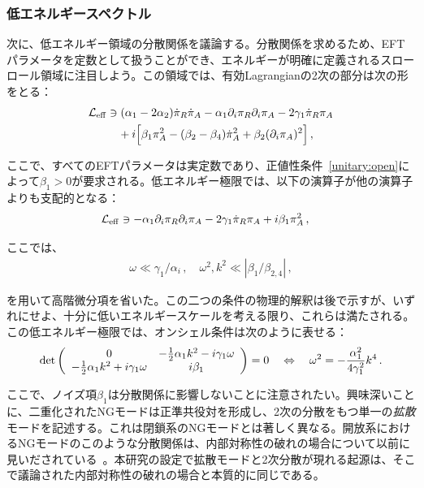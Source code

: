 \subsubsection{低エネルギースペクトル}

次に、低エネルギー領域の分散関係を議論する。分散関係を求めるため、EFTパラメータを定数として扱うことができ、エネルギーが明確に定義されるスローロール領域に注目しよう。この領域では、有効Lagrangianの2次の部分は次の形をとる：
\begin{align}
\nonumber
\mathcal{L}_{\rm eff}&\ni
(\alpha_1-2\alpha_2)\dot{\pi}_R\dot{\pi}_A-\alpha_1\partial_i\pi_R\partial_i\pi_A
-2\gamma_1\dot{\pi}_R\pi_A
\\
\label{quadratic_EFT}
&\quad
+i\Big[
\beta_1\pi_A^2-(\beta_2-\beta_4)\dot{\pi}_A^2+\beta_2(\partial_i\pi_A)^2
\Big]\,,
\end{align}

ここで、すべてのEFTパラメータは実定数であり、正値性条件~\eqref{unitary:open}によって$\beta_1>0$が要求される。低エネルギー極限では、以下の演算子が他の演算子よりも支配的となる：
\begin{align}
\nonumber
\mathcal{L}_{\rm eff}&\ni
-\alpha_1\partial_i\pi_R\partial_i\pi_A
-2\gamma_1\dot{\pi}_R\pi_A
+i\beta_1\pi_A^2\,,
\end{align}

ここでは、
\begin{align}
\label{low-energy_assumptions}
\omega\ll\gamma_1/\alpha_i\,,
\quad
\omega^2,k^2\ll|\beta_1/\beta_{2,4}|\,,
\end{align}

を用いて高階微分項を省いた。この二つの条件の物理的解釈は後で示すが、いずれにせよ、十分に低いエネルギースケールを考える限り、これらは満たされる。この低エネルギー極限では、オンシェル条件は次のように表せる：
\begin{align}
{\rm det}\left(
\begin{array}{cc}0 &-\frac{1}{2} \alpha_1k^2- i\gamma_1\omega \\ -\frac{1}{2}\alpha_1k^2+i\gamma_1\omega & i\beta_1\end{array}
\right)=0
\quad
\Leftrightarrow
\quad
\omega^2=-\frac{\alpha_1^2}{4\gamma_1^2}k^4\,.
\end{align}

ここで、ノイズ項$\beta_1$は分散関係に影響しないことに注意されたい。興味深いことに、二重化されたNGモードは正準共役対を形成し、2次の分散をもつ単一の\textit{拡散}モードを記述する。これは閉鎖系のNGモードとは著しく異なる。開放系におけるNGモードのこのような分散関係は、内部対称性の破れの場合について以前に見いだされている~\cite{Minami:2018oxl}。本研究の設定で拡散モードと2次分散が現れる起源は、そこで議論された内部対称性の破れの場合と本質的に同じである。

